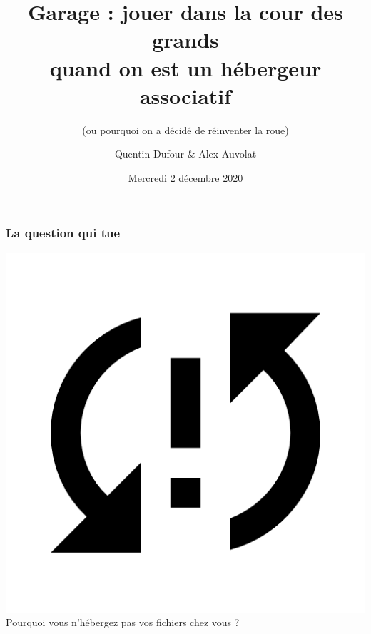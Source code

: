 \documentclass[aspectratio=169]{beamer}
\title[Garage : jouer dans la cour des grands quand on est un hébergeur associatif]{Garage : jouer dans la cour des grands \\quand on est un hébergeur associatif}
\subtitle{(ou pourquoi on a décidé de réinventer la roue)}
\author[Q. Dufour \& A. Auvolat]{Quentin Dufour \& Alex Auvolat}
\date[02/12/2020]{Mercredi 2 décembre 2020}
\begin{document}
\begin{frame}
\titlepage
\end{frame}

\begin{frame}
	\frametitle{La question qui tue}
	
	\begin{center}
		\includegraphics[scale=3]{img/sync.png} \\
		\Huge Pourquoi vous n'hébergez pas vos fichiers chez vous ? \\
	\end{center}

\end{frame}
\end{document}
